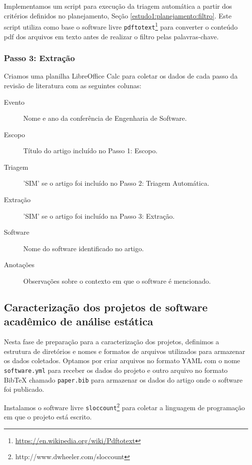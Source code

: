 Implementamos um script para execução da triagem automática a partir dos
critérios definidos no planejamento, Seção \ref{estudo1:planejamento:filtro}.
Este script utiliza como base o software livre
\texttt{pdftotext}\footnote{\url{https://en.wikipedia.org/wiki/Pdftotext}} para
converter o conteúdo pdf dos arquivos em texto antes de realizar o filtro pelas
palavras-chave.

\subsubsection{Passo 3: Extração}

Criamos uma planilha LibreOffice Calc para coletar os dados de cada passo da
revisão de literatura com as seguintes colunas:

\begin{description}
  \item[Evento] Nome e ano da conferência de Engenharia de Software.
  \item[Escopo] Título do artigo incluído no Passo 1: Escopo.
  \item[Triagem] 'SIM' se o artigo foi incluído no Passo 2: Triagem Automática.
  \item[Extração] 'SIM' se o artigo foi incluído na Passo 3: Extração.
  \item[Software] Nome do software identificado no artigo.
  \item[Anotações] Observações sobre o contexto em que o software é mencionado.
\end{description}

\subsection{Caracterização dos projetos de software acadêmico de análise estática}

Nesta fase de preparação para a caracterização dos projetos, definimos a
estrutura de diretórios e nomes e formatos de arquivos utilizados para
armazenar os dados coletados. Optamos por criar arquivos no formato YAML com o
nome \texttt{software.yml} para receber os dados do projeto e outro arquivo no
formato BibTeX chamado \texttt{paper.bib} para armazenar os dados do artigo
onde o software foi publicado.

Instalamos o software livre
\texttt{sloccount}\footnote{http://www.dwheeler.com/sloccount} para coletar a
linguagem de programação em que o projeto está escrito.



